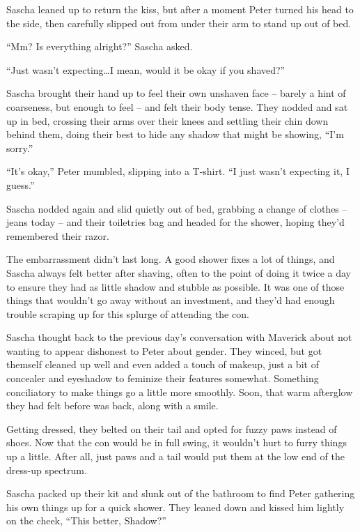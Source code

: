 Sascha leaned up to return the kiss, but after a moment Peter turned his head to the side, then carefully slipped out from under their arm to stand up out of bed.

``Mm? Is everything alright?'' Sascha asked.

``Just wasn't expecting\ldots{}I mean, would it be okay if you shaved?''

Sascha brought their hand up to feel their own unshaven face -- barely a hint of coarseness, but enough to feel -- and felt their body tense. They nodded and sat up in bed, crossing their arms over their knees and settling their chin down behind them, doing their best to hide any shadow that might be showing, ``I'm sorry.''

``It's okay,'' Peter mumbled, slipping into a T-shirt. ``I just wasn't expecting it, I guess.''

Sascha nodded again and slid quietly out of bed, grabbing a change of clothes -- jeans today -- and their toiletries bag and headed for the shower, hoping they'd remembered their razor.

\secdiv

The embarrassment didn't last long. A good shower fixes a lot of things, and Sascha always felt better after shaving, often to the point of doing it twice a day to ensure they had as little shadow and stubble as possible. It was one of those things that wouldn't go away without an investment, and they'd had enough trouble scraping up for this splurge of attending the con.

Sascha thought back to the previous day's conversation with Maverick about not wanting to appear dishonest to Peter about gender. They winced, but got themself cleaned up well and even added a touch of makeup, just a bit of concealer and eyeshadow to feminize their features somewhat. Something conciliatory to make things go a little more smoothly. Soon, that warm afterglow they had felt before was back, along with a smile.

Getting dressed, they belted on their tail and opted for fuzzy paws instead of shoes. Now that the con would be in full swing, it wouldn't hurt to furry things up a little. After all, just paws and a tail would put them at the low end of the dress-up spectrum.

Sascha packed up their kit and slunk out of the bathroom to find Peter gathering his own things up for a quick shower. They leaned down and kissed him lightly on the cheek, ``This better, Shadow?''

